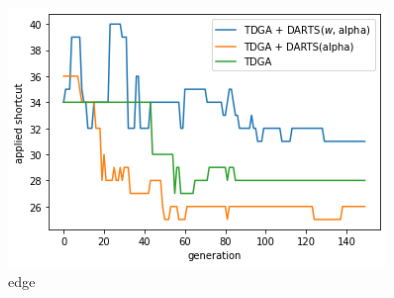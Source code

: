 \begin{figure}[t]
  \begin{center}
    \includegraphics[clip,width=10cm]{./fig/04.exp/edge.png}
  \end{center}
  \caption{edge}
  \label{fig:exp2/edge}
\end{figure}


